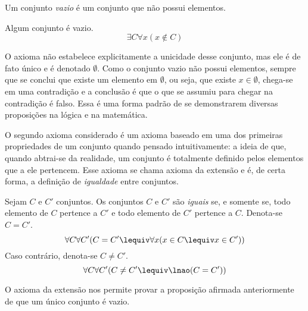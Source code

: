 \begin{defi}
Um conjunto \emph{vazio} é um conjunto que não possui elementos.
\end{defi}

\setcounter{axi}{-1}

\begin{axi}[Vazio]
Algum conjunto é vazio.
	\begin{equation*}
	\exists C \forall x(x \notin C)
	\end{equation*}
\end{axi}

O axioma não estabelece explicitamente a unicidade desse conjunto, mas ele é de fato único e é denotado $\emptyset$. Como o conjunto vazio não possui elementos, sempre que se conclui que existe um elemento em $\emptyset$, ou seja, que existe $x \in \emptyset$, chega-se em uma contradição e a conclusão é que o que se assumiu para chegar na contradição é falso. Essa é uma forma padrão de se demonstrarem diversas proposições na lógica e na matemática.

O segundo axioma considerado é um axioma baseado em uma dos primeiras propriedades de um conjunto quando pensado intuitivamente: a ideia de que, quando abtrai-se da realidade, um conjunto é totalmente definido pelos elementos que a ele pertencem. Esse axioma se chama axioma da extensão e é, de certa forma, a definição de \emph{igualdade} entre conjuntos.

\begin{axi}[Extensão]
Sejam $C$ e $C'$ conjuntos. Os conjuntos $C$ e $C'$ são \emph{iguais} se, e somente se, todo elemento de $C$ pertence a $C'$ e todo elemento de $C'$ pertence a $C$. Denota-se $C=C'$.
	\begin{equation*}
	\forall C \forall C' (C = C' \lequiv \forall x (x \in C \lequiv x \in C'))
	\end{equation*}
Caso contrário, denota-se $C \neq C'$.
	\begin{equation*}
	\forall C \forall C' (C \neq C' \lequiv \lnao (C = C'))
	\end{equation*}
\end{axi}

O axioma da extensão nos permite provar a proposição afirmada anteriormente de que um único conjunto é vazio.

